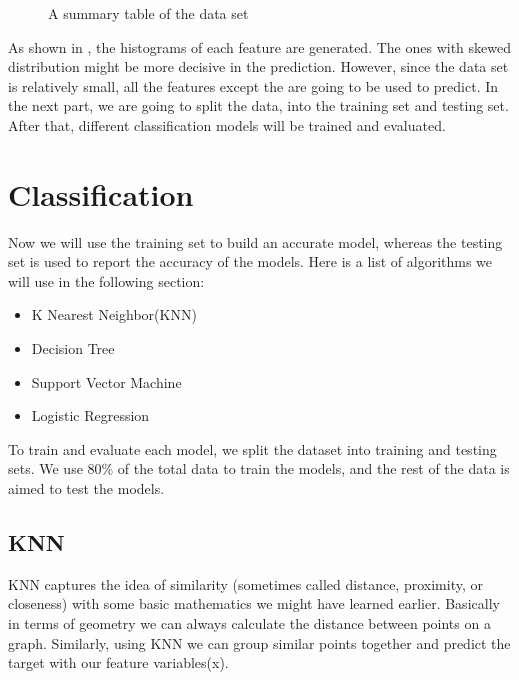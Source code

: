 \documentclass[letterpaper,10pt,english]{jupyterBook}
\let\sphinxpxdimen\pdfpxdimen\else\newdimen\sphinxpxdimen
\begin{document}
\begin{figure}[htbp]
\centering
\capstart

\noindent\sphinxincludegraphics[width=800\sphinxpxdimen]{{fig1}.png}
\caption{A summary table of the data set}\label{\detokenize{analysis:f1}}\end{figure}

\sphinxAtStartPar
As shown in {\hyperref[\detokenize{analysis:f1}]{}}, the histograms of each feature are generated. The ones with skewed distribution might be more decisive in the prediction. However, since the data set is relatively small, all the features except the  are going to be used to predict. In the next part, we are going to split the data, into the training set and testing set. After that, different classification models will be trained and evaluated.


\section{Classification}
\label{\detokenize{analysis:classification}}
\sphinxAtStartPar
Now we will use the training set to build an accurate model, whereas the testing set is used to report the accuracy of the models. Here is a list of algorithms we will use in the following section:
\begin{itemize}
\item {} 
\sphinxAtStartPar
K Nearest Neighbor(KNN)

\item {} 
\sphinxAtStartPar
Decision Tree

\item {} 
\sphinxAtStartPar
Support Vector Machine

\item {} 
\sphinxAtStartPar
Logistic Regression

\end{itemize}

\sphinxAtStartPar
To train and evaluate each model, we split the dataset into training and testing sets. We use 80\% of the total data to train the models, and the rest of the data is aimed to test the models.


\subsection{KNN}
\label{\detokenize{analysis:knn}}
\sphinxAtStartPar
KNN captures the idea of similarity (sometimes called distance, proximity, or closeness)
with some basic mathematics we might have learned earlier. Basically in terms of geometry we can always calculate the distance between points on a graph. Similarly, using KNN we can group similar points together and predict the target with our feature variables(x).
\end{document}
